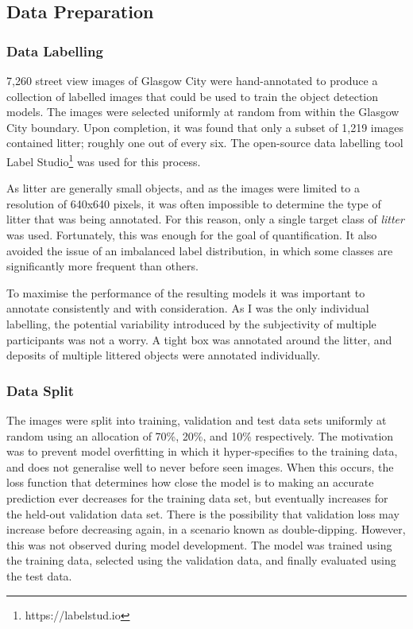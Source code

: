 \documentclass{thesis}
\begin{document}
\subsection{Data Preparation}

\subsubsection{Data Labelling}

7,260 street view images of Glasgow City were hand-annotated to produce a collection of labelled images that could be used to train the object detection models. The images were selected uniformly at random from within the Glasgow City boundary. Upon completion, it was found that only a subset of 1,219 images contained litter; roughly one out of every six. The open-source data labelling tool Label Studio\footnote{https://labelstud.io} was used for this process.

As litter are generally small objects, and as the images were limited to a resolution of 640x640 pixels, it was often impossible to determine the type of litter that was being annotated. For this reason, only a single target class of \textit{litter} was used. Fortunately, this was enough for the goal of quantification. It also avoided the issue of an imbalanced label distribution, in which some classes are significantly more frequent than others.

To maximise the performance of the resulting models it was important to annotate consistently and with consideration. As I was the only individual labelling, the potential variability introduced by the subjectivity of multiple participants was not a worry. A tight box was annotated around the litter, and deposits of multiple littered objects were annotated individually.

\subsubsection{Data Split}

The images were split into training, validation and test data sets uniformly at random using an allocation of 70\%, 20\%, and 10\% respectively. The motivation was to prevent model overfitting in which it hyper-specifies to the training data, and does not generalise well to never before seen images. When this occurs, the loss function that determines how close the model is to making an accurate prediction ever decreases for the training data set, but eventually increases for the held-out validation data set. There is the possibility that validation loss may increase before decreasing again, in a scenario known as double-dipping. However, this was not observed during model development. The model was trained using the training data, selected using the validation data, and finally evaluated using the test data.
\end{document}
